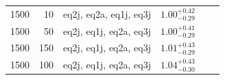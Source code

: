 \begin{table}
\begin{tabular}{rrcccc}
     1500 &  10 & eq2j, eq2a, eq1j, eq3j & $1.00_{-0.29}^{+0.42}$    \\ %
     1500 &  50 & eq2j, eq1j, eq2a, eq3j & $1.00_{-0.29}^{+0.41}$    \\ %
     1500 & 150 & eq2j, eq1j, eq2a, eq3j & $1.01_{-0.29}^{+0.43}$    \\ %
     1500 & 100 & eq2j, eq1j, eq2a, eq3j & $1.04_{-0.30}^{+0.43}$    \\ %
    
    

\end{tabular}
\end{table}
